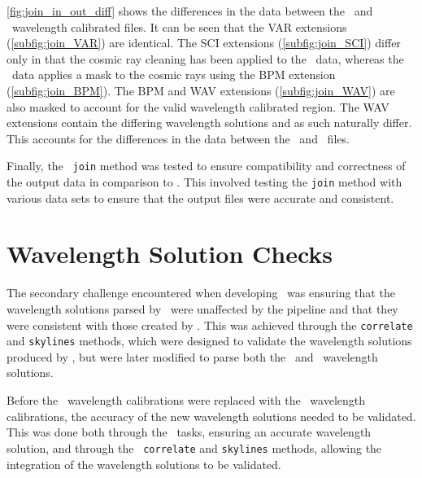 \autoref{fig:join_in_out_diff} shows the differences in the data between the \polsalt\ and \stops\ wavelength calibrated files. It can be seen that the \gls{VAR} extensions (\autoref{subfig:join_VAR}) are identical. The \gls{SCI} extensions (\autoref{subfig:join_SCI}) differ only in that the cosmic ray cleaning has been applied to the \stops\ data, whereas the \polsalt\ data applies a mask to the cosmic rays using the \gls{BPM} extension (\autoref{subfig:join_BPM}). The \gls{BPM} and \gls{WAV} extensions (\autoref{subfig:join_WAV}) are also masked to account for the valid wavelength calibrated region. The \gls{WAV} extensions contain the differing wavelength solutions and as such naturally differ. This accounts for the differences in the data between the \polsalt\ and \stops\ files.

Finally, the \stops\ \texttt{join} method was tested to ensure compatibility and correctness of the output data in comparison to \polsalt. This involved testing the \texttt{join} method with various data sets to ensure that the output files were accurate and consistent.

\section{Wavelength Solution Checks} \label{sec:test_wav}

The secondary challenge encountered when developing \stops\ was ensuring that the wavelength solutions parsed by \stops\ were unaffected by the pipeline and that they were consistent with those created by \polsalt. This was achieved through the \texttt{correlate} and \texttt{skylines} methods, which were designed to validate the wavelength solutions produced by \iraf, but were later modified to parse both the \iraf\ and \polsalt\ wavelength solutions.

Before the \polsalt\ wavelength calibrations were replaced with the \iraf\ wavelength calibrations, the accuracy of the new wavelength solutions needed to be validated. This was done both through the \iraf\ tasks, ensuring an accurate wavelength solution, and through the \stops\ \texttt{correlate} and \texttt{skylines} methods, allowing the integration of the wavelength solutions to be validated.


